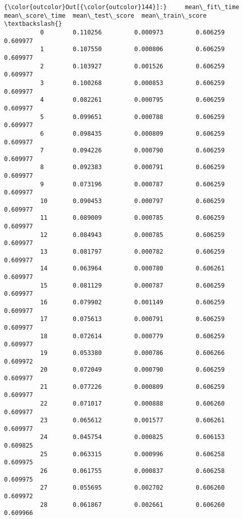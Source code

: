 \documentclass[11pt]{article}
\begin{document}
            \begin{Verbatim}[commandchars=\\\{\}]
{\color{outcolor}Out[{\color{outcolor}144}]:}     mean\_fit\_time  mean\_score\_time  mean\_test\_score  mean\_train\_score  \textbackslash{}
          0        0.110256         0.000973         0.606259          0.609977   
          1        0.107550         0.000806         0.606259          0.609977   
          2        0.103927         0.001526         0.606259          0.609977   
          3        0.100268         0.000853         0.606259          0.609977   
          4        0.082261         0.000795         0.606259          0.609977   
          5        0.099651         0.000788         0.606259          0.609977   
          6        0.098435         0.000809         0.606259          0.609977   
          7        0.094226         0.000790         0.606259          0.609977   
          8        0.092383         0.000791         0.606259          0.609977   
          9        0.073196         0.000787         0.606259          0.609977   
          10       0.090453         0.000797         0.606259          0.609977   
          11       0.089009         0.000785         0.606259          0.609977   
          12       0.084943         0.000785         0.606259          0.609977   
          13       0.081797         0.000782         0.606259          0.609977   
          14       0.063964         0.000780         0.606261          0.609977   
          15       0.081129         0.000787         0.606259          0.609977   
          16       0.079902         0.001149         0.606259          0.609977   
          17       0.075613         0.000791         0.606259          0.609977   
          18       0.072614         0.000779         0.606259          0.609977   
          19       0.053380         0.000786         0.606266          0.609972   
          20       0.072049         0.000790         0.606259          0.609977   
          21       0.077226         0.000809         0.606259          0.609977   
          22       0.071017         0.000888         0.606260          0.609977   
          23       0.065612         0.001577         0.606261          0.609977   
          24       0.045754         0.000825         0.606153          0.609825   
          25       0.063315         0.000996         0.606258          0.609975   
          26       0.061755         0.000837         0.606258          0.609975   
          27       0.055695         0.002702         0.606260          0.609972   
          28       0.061867         0.002661         0.606260          0.609966   

\end{Verbatim}
\end{document}
